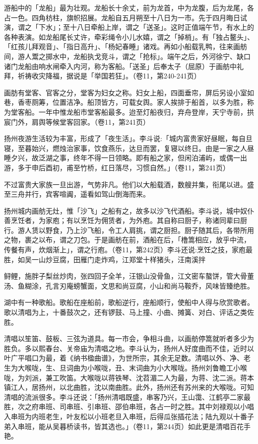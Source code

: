 游船中的「龙船」最为壮观。龙船长十余丈，前为龙首，中为龙腹，后为龙尾，各占一色。四角枋柱，旗帜招展。龙船自五月朔至十八日为一市。先于四月晦日试演，谓之「下水」；至十八日牵船上岸，谓之「送圣」。这时正值端午节，有水上的各种表演。如龙船尾长丈许，牵彩绳令小儿水嬉，谓之「掉梢」。有「独占鳌头」、「红孩儿拜观音」、「指日高升」、「杨妃春睡」诸戏。再如小船载乳鸭，往来画舫间，游人鬻之掷水中，龙船执戈竞斗，谓之「抢标」。端午之后，外河徐宁、缺口诸门龙船由响水闸牵入内河，称为客船。「送圣」后奉太子（屈原）于画舫中礼拜，祈祷收灾降福，据说是「举国若狂」。（卷11，第240-241页）

画肪有堂客、官客之分，堂客为妇女之称。妇女上船，四面垂帘，屏后另设小室如巷，香枣厕筹，位置洁净。船顶皆方，可载女舆。家人挨排于船首，以多为胜，称为堂客船。一年中惟龙船市堂客船最多。迨至灯船夜归，弃舟登岸，天宁寺前，拱宸门外，肩舆等候堂客回家。（卷11，第241页）

扬州夜游生活较为丰富，形成了「夜生活」。李斗说:「城内富贵家好昼眠，每自旦寝，至暮始兴，燃烛治家事，饮食燕乐，达旦而罢，复寝以终日。由是一家之人昼睡夕兴，故泛湖之事，终年不得一日领略。即有船之家，但闲泊浦屿，或偶一出游，多于申后酉初，甫至竹桥，红日落尽，习惯自然。」（卷11，第241页）

不过富贵大家族一旦出游，气势非凡。他们以大船载酒，数艘并集，衔尾以进。盛至三舟并行，宾客喧阗，遥看如驾山倒海而来。

扬州城内画舫无灶，惟「沙飞」之船有之，故多以沙飞代酒船。李斗说，城中奴仆善烹饪者，为家庖；有以烹饪为佣赁者，为外庖。其自称曰厨子，称诸同辈曰厨行。游人赁以野食，乃上沙飞船，令工人肩挑，谓之厨担。厨子随其后，各带所用之物，裹之以布，谓之刀包。于是画舫在前，酒船在后，「橹篙相应，放乎中流，传餐有声，炊烟渐上」，谓之行庖。（卷11，第242页）李斗还说:烹饪之技，家庖最胜，如吴一山炒豆腐，田雁门走炸鸡，江郑堂十样猪头，汪南溪拌


\noindent 鲟鲤，施胖子梨丝炒肉，张四回子全羊，汪银山没骨鱼，江文密车螯饼，管大骨董汤、鱼糊涂，孔言刃庵螃蟹面，文思和尚豆腐，小山和尚马鞍乔，风味皆臻绝胜。

湖中有一种歌船。歌船在座船前，歌船逆行，座船顺行，使船中人得与欣赏歌者。歌以清唱为上，十番鼓次之，还有锣鼓、马上撞、小曲、摊簧、对白、评话之类佐胜。

清唱以笙笛、鼓板、三弦为道具。每一市会，争相斗曲，以画舫停篙就听者多少为胜负。多以熙春台、关帝庙为清唱之地。李斗认为，扬州人好度曲而不佳，近时以叶广平唱口为最，着《纳书楹曲谱》，为世所宗，其余无足数。清唱以外、净、老生为大喉咙，生、旦词曲为小喉咙，丑、末词曲为小大喉咙。扬州刘鲁瞻工小喉咙，为刘派，兼工吹笛。大喉咙以蒋铁琴、沈苕湄二人为最，为蒋、沈二派。蒋本镇江人，居扬州，以北曲胜，沈以南曲胜。此外，扬州还有苏州来的大喉咙。可知清唱的流派很多。李斗还说：「扬州清唱既盛，串客乃兴，王山霭、江鹤亭二家最胜，次之府串班、司串班、引串班、邵伯串班，各占一时之胜。其中刘禄观以小唱入串班为内班老生，叶友松以小班老旦入串班，后得瓜张插花法；陆九观以十番子弟入串班，能从吴暮桥读书，皆其选也。」（卷11，第244页）如此更是清唱百花手艳。

